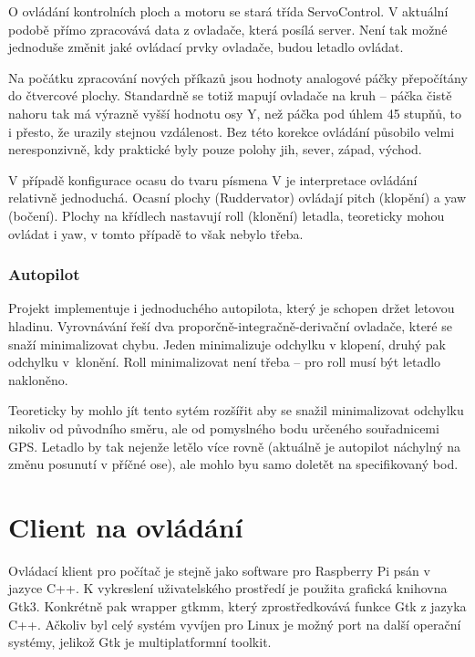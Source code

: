\documentclass[a4paper,oneside,12pt]{report}
\begin{document}
O ovládání kontrolních ploch a motoru se stará třída ServoControl.
V aktuální podobě přímo zpracovává data z ovladače, která posílá server.
Není tak možné jednoduše změnit jaké ovládací prvky ovladače, budou letadlo ovládat.

Na počátku zpracování nových příkazů jsou hodnoty analogové páčky přepočítány do čtvercové plochy.
Standardně se totiž mapují ovladače na kruh -- páčka čistě nahoru tak má výrazně vyšší hodnotu osy Y, než páčka pod úhlem 45 stupňů, to i přesto, že urazily stejnou vzdálenost.
Bez této korekce ovládání působilo velmi neresponzivně, kdy praktické byly pouze polohy jih, sever, západ, východ.

V případě konfigurace ocasu do tvaru písmena V je interpretace ovládání relativně jednoduchá.
Ocasní plochy (Ruddervator) ovládají pitch (klopění) a yaw (bočení).
Plochy na křídlech nastavují roll (klonění) letadla, teoreticky mohou ovládat i yaw, v tomto případě to však nebylo třeba.

\subsection{Autopilot}

Projekt implementuje i jednoduchého autopilota, který je schopen držet letovou hladinu.
Vyrovnávání řeší dva proporčně-integračně-derivační ovladače, které se snaží minimalizovat chybu.
Jeden minimalizuje odchylku v klopení, druhý pak odchylku v~klonění.
Roll minimalizovat není třeba -- pro roll musí být letadlo nakloněno.

Teoreticky by mohlo jít tento sytém rozšířit aby se snažil minimalizovat odchylku nikoliv od původního směru, ale od pomyslného bodu určeného souřadnicemi GPS.
Letadlo by tak nejenže letělo více rovně (aktuálně je autopilot náchylný na změnu posunutí v příčné ose), ale mohlo byu samo doletět na specifikovaný bod.


\chapter{Client na ovládání}

Ovládací klient pro počítač je stejně jako software pro Raspberry Pi psán v jazyce C++.
K vykreslení uživatelského prostředí je použita grafická knihovna Gtk3.
Konkrétně pak wrapper gtkmm, který zprostředkovává funkce Gtk z jazyka C++.
Ačkoliv byl celý systém vyvíjen pro Linux je možný port na další operační systémy, jelikož Gtk je multiplatformní toolkit.
\end{document}
